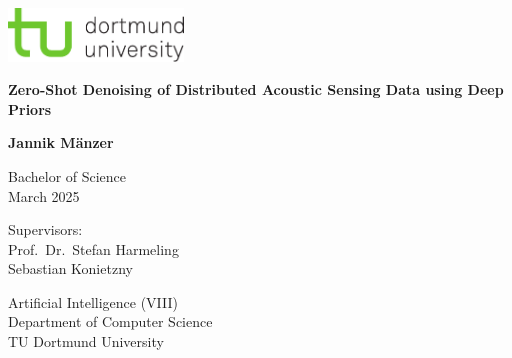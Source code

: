 \begin{titlepage}
    \begin{center}
        \begin{minipage}[t]{\textwidth}
            \raggedleft
            \includegraphics[width=0.35\textwidth]{img/tud-logo.pdf}
        \end{minipage}
    
        \vspace{3cm}
            
        \Huge
        \textbf{Zero-Shot Denoising of Distributed Acoustic Sensing Data using Deep Priors}
            
        \vspace{1.5cm}
            
        \LARGE
        \textbf{Jannik Mänzer}
            
        \vspace{1.5cm}
          
        \Large
        Bachelor of Science\\
        March 2025\\
    \end{center}

    \vfill

    \noindent
    \begin{minipage}[t]{0.5\textwidth}
        \raggedright
        \Large
        Supervisors:\\
        Prof.~Dr.~Stefan Harmeling\\
        Sebastian Konietzny\\
    \end{minipage}
    \hfill
    \begin{minipage}[t]{0.5\textwidth}
        \raggedleft
        \Large
        Artificial Intelligence (VIII)\\
        Department of Computer Science\\
        TU Dortmund University\\
    \end{minipage}
\end{titlepage}
